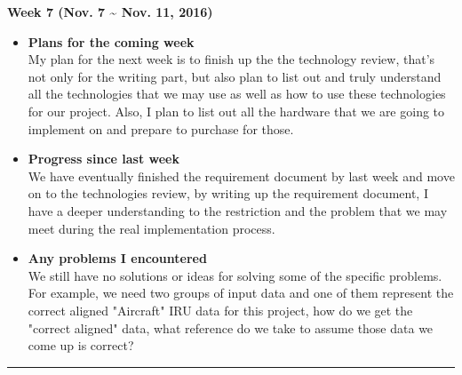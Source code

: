 		\begin{center}
			\textbf{Week 7 (Nov. 7 {\textasciitilde{}} Nov. 11, 2016)}
		\end{center}
		\begin{itemize}
			\item \textbf{Plans for the coming week}
			\\My plan for the next week is to finish up the the technology review, that's not only for the writing part, but also plan to list out and truly understand all the technologies that we may use as well as how to use these technologies for our project. Also, I plan to list out all the hardware that we are going to implement on and prepare to purchase for those.\\

			\item \textbf{Progress since last week}
			\\We have eventually finished the requirement document by last week and move on to the technologies review, by writing up the requirement document, I have a deeper understanding to the restriction and the problem that we may meet during the real implementation process.\\

			\item \textbf{Any problems I encountered}
			\\We still have no solutions or ideas for solving some of the specific problems. For example, we need two groups of input data and one of them represent the correct aligned "Aircraft" IRU data for this project, how do we get the "correct aligned" data, what reference do we take to assume those data we come up is correct?\\
		\end{itemize}

		\rule{\textwidth}{0.5pt}

